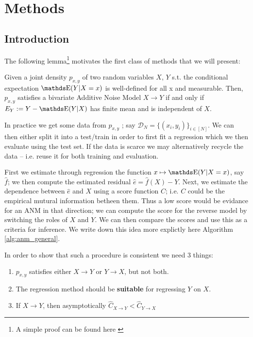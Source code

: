 \section{Methods}

\subsection{Introduction}

The following lemma\footnote{A simple proof can be found here \cite{Mooij2016jmlr}} motivates the 
first class of methods that we will present:

\begin{lemma}
    Given a joint density $p_{x, y}$ of two random variables $X$, $Y$ s.t. the conditional expectation
    $\E(Y |X = x)$ is well-defined for all x and measurable. Then, $p_{x, y}$ satisfies a bivariate 
    Additive Noise Model $X \rightarrow Y$ if and only if $E_Y := Y - \E(Y|X)$ has 
    finite mean and is independent of $X$.
\end{lemma}

In practice we get some data from $p_{x, y}$ ; say 
$\mathcal{D}_N = \{ (x_i, y_i )\}_{i \in [N]}$. We can then either split it into a test/train in order to 
first fit a regression which we then evaluate using the test set. If the data is scarce we may alternatively 
recycle the data -- i.e. reuse it for both training and evaluation.

First we estimate through regression the function $x \mapsto \E(Y | X=x)$, say $\hat{f}$; we 
then compute the estimated residual $\hat{e} = \hat{f}(X) - Y$. 
Next, we estimate the dependence between $\hat{e}$ and $X$ using a score function $C$; i.e. $C$ could be 
the empirical mutural information betheen them. Thus a low score would be evidance for an ANM in that direction; 
we can compute the score for the reverse model by switching the roles of $X$ and $Y$. We can then compare 
the scores and use this as a criteria for inference. We write down this idea more explictly 
here Algorithm \ref{alg:anm_general}.

In order to show that such a procedure is consistent we need 3 things:

\begin{enumerate}
    \item $p_{x, y}$ satisfies either $X \rightarrow Y$ or $Y \rightarrow X$, but not both.
    \item The regression method should be \textbf{suitable} for regressing $Y$ on $X$.
    \item If $X \rightarrow Y$, then asymptotically $\hat{C}_{X \rightarrow Y} < \hat{C}_{Y \rightarrow X}$
\end{enumerate}


